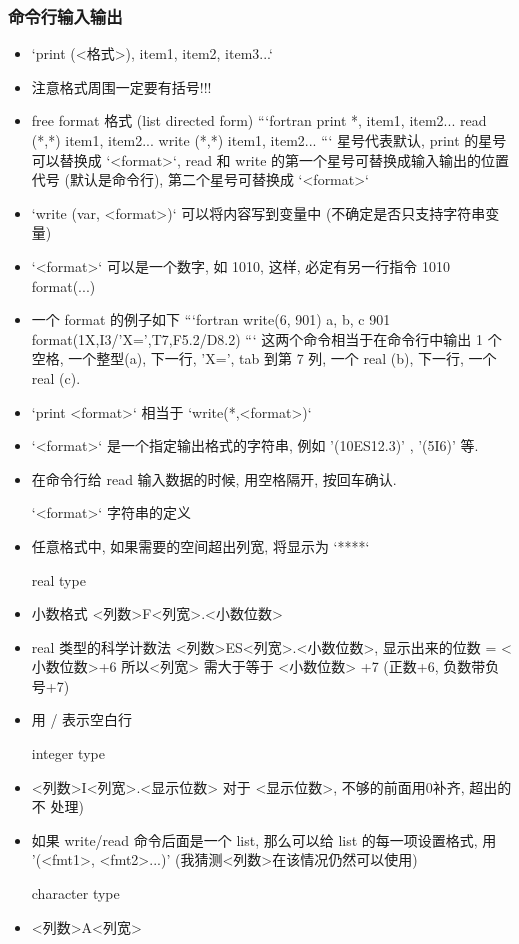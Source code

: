 \subsubsection{命令行输入输出}
\begin{itemize}
\item `print (<格式>), item1, item2, item3...`
\item 注意格式周围一定要有括号!!!
\item free format 格式 (list directed form)
```fortran
   print *, item1, item2...
   read (*,*) item1, item2... 
   write (*,*) item1, item2...
```
   星号代表默认, print 的星号可以替换成 `<format>`, read 和 write 的第一个星号可替换成输入输出的位置代号 (默认是命令行), 第二个星号可替换成 `<format>`
\item `write (var, <format>)` 可以将内容写到变量中 (不确定是否只支持字符串变量)
\item `<format>` 可以是一个数字, 如 1010, 这样, 必定有另一行指令 1010 format(...)
\item 一个 format 的例子如下
```fortran
write(6, 901) a, b, c
901 format(1X,I3/'X=',T7,F5.2/D8.2)
```
这两个命令相当于在命令行中输出 1 个空格, 一个整型(a), 下一行, 'X=', tab 到第 7 列, 一个 real (b), 下一行, 一个 real (c).
\item `print <format>` 相当于 `write(*,<format>)`
\item `<format>` 是一个指定输出格式的字符串, 例如 '(10ES12.3)' , '(5I6)' 等.
\item 在命令行给 read 输入数据的时候, 用空格隔开, 按回车确认.

`<format>` 字符串的定义
\item 任意格式中, 如果需要的空间超出列宽, 将显示为 `****`

real type
\item 小数格式 <列数>F<列宽>.<小数位数>
\item real 类型的科学计数法  <列数>ES<列宽>.<小数位数>, 显示出来的位数 = <小数位数>+6
  所以<列宽> 需大于等于 <小数位数> +7 (正数+6, 负数带负号+7)
\item 用 / 表示空白行

integer type
\item <列数>I<列宽>.<显示位数>  对于 <显示位数>, 不够的前面用0补齐, 超出的不
   处理)
\item 如果 write/read 命令后面是一个 list, 那么可以给 list 的每一项设置格式, 用 '(<fmt1>, <fmt2>...)'  (我猜测<列数>在该情况仍然可以使用)

character type
\item <列数>A<列宽>


\end{itemize}
